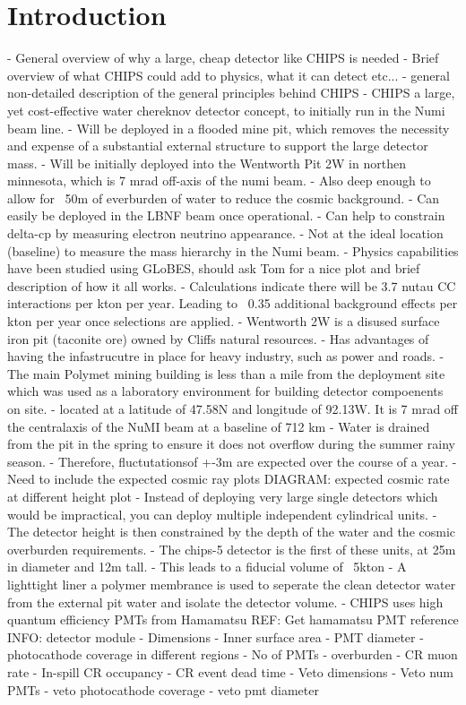 \section{Introduction}
\label{sec:chips_intro}
- General overview of why a large, cheap detector like CHIPS is needed
- Brief overview of what CHIPS could add to physics, what it can detect etc...
- general non-detailed description of the general principles behind CHIPS
- CHIPS a large, yet cost-effective water chereknov detector concept, to initially run in the Numi beam line.
- Will be deployed in a flooded mine pit, which removes the necessity and expense of a substantial external structure to support the large detector mass.
- Will be initially deployed into the Wentworth Pit 2W in northen minnesota, which is 7 mrad off-axis of the numi beam.
- Also deep enough to allow for ~50m of everburden of water to reduce the cosmic background.
- Can easily be deployed in the LBNF beam once operational.
- Can help to constrain delta-cp by measuring electron neutrino appearance.
- Not at the ideal location (baseline) to measure the mass hierarchy in the Numi beam.
- Physics capabilities have been studied using GLoBES, should ask Tom for a nice plot and brief description of how it all works.
- Calculations indicate there will be 3.7 nutau CC interactions per kton per year. Leading to ~0.35 additional background effects per kton per year once selections are applied.
- Wentworth 2W is a disused surface iron pit (taconite ore) owned by Cliffs natural resources.
- Has advantages of having the infastrucutre in place for heavy industry, such as power and roads.
- The main Polymet mining building is less than a mile from the deployment site which was used as a laboratory environment for building detector compoenents on site.
- located at a latitude of 47.58N and longitude of 92.13W. It is 7 mrad off the centralaxis of the NuMI beam at a baseline of 712 km
- Water is drained from the pit in the spring to ensure it does not overflow during the summer rainy season.
- Therefore, fluctutationsof +-3m are expected over the course of a year.
- Need to include the expected cosmic ray plots
DIAGRAM: expected cosmic rate at different height plot
- Instead of deploying very large single detectors which would be impractical, you can deploy multiple independent cylindrical units.
- The detector height is then constrained by the depth of the water and the cosmic overburden requirements.
- The chips-5 detector is the first of these units, at 25m in diameter and 12m tall.
- This leads to a fiducial volume of ~5kton
- A lighttight liner a polymer membrance is used to seperate the clean detector water from the external pit water and isolate the detector volume.
- CHIPS uses high quantum efficiency PMTs from Hamamatsu
REF: Get hamamatsu PMT reference
INFO: detector module
- Dimensions
- Inner surface area
- PMT diameter
- photocathode coverage in different regions
- No of PMTs
- overburden
- CR muon rate
- In-spill CR occupancy
- CR event dead time
- Veto dimensions
- Veto num PMTs
- veto photocathode coverage
- veto pmt diameter

